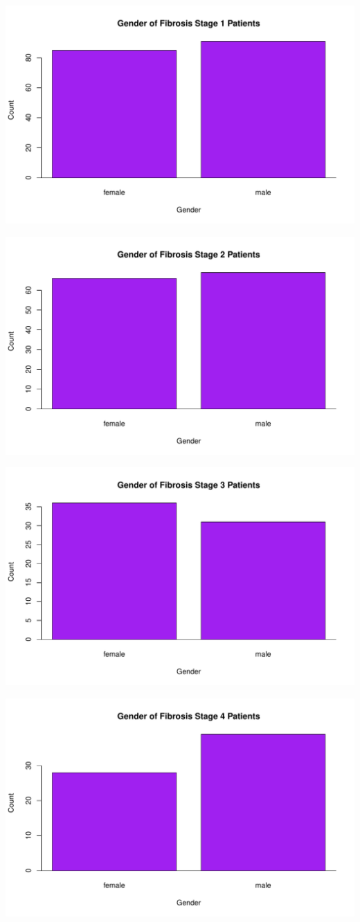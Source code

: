 \documentclass{article}
\begin{document}
\includegraphics{HW0-031}

\includegraphics{HW0-032}

\includegraphics{HW0-033}

\includegraphics{HW0-034}
\newpage

\end{document}
